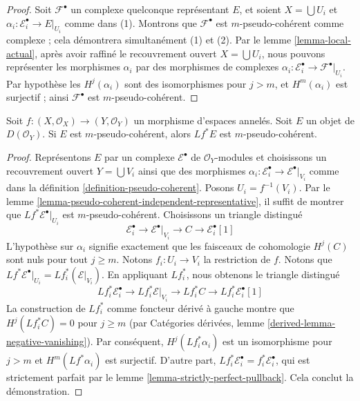 \begin{proof}

Soit $\mathcal{F}^\bullet$ un complexe quelconque représentant $E$,
et soient $X = \bigcup U_i$ et
$\alpha_i : \mathcal{E}_i^\bullet \to E|_{U_i}$ comme dans (1). Montrons que $\mathcal{F}^\bullet$ est $m$-pseudo-cohérent comme complexe ; cela démontrera simultanément (1) et (2). Par le lemme \ref{lemma-local-actual},
après avoir raffiné le recouvrement ouvert $X = \bigcup U_i$, nous pouvons
représenter les morphismes $\alpha_i$ par des morphismes de complexes
$\alpha_i : \mathcal{E}_i^\bullet \to \mathcal{F}^\bullet|_{U_i}$. Par hypothèse
les $H^j(\alpha_i)$ sont des isomorphismes pour $j > m$, et $H^m(\alpha_i)$
est surjectif ; ainsi $\mathcal{F}^\bullet$ est
$m$-pseudo-cohérent.

\end{proof}

\begin{lemma}

\label{lemma-pseudo-coherent-pullback}
Soit $f : (X, \mathcal{O}_X) \to (Y, \mathcal{O}_Y)$ un morphisme d'espaces annelés. Soit $E$ un objet de $D(\mathcal{O}_Y)$. Si $E$ est $m$-pseudo-cohérent, alors $Lf^*E$ est $m$-pseudo-cohérent.
\end{lemma}

\begin{proof}

Représentons $E$ par un complexe $\mathcal{E}^\bullet$ de $\mathcal{O}_Y$-modules et choisissons un recouvrement ouvert $Y = \bigcup V_i$ ainsi que des morphismes
$\alpha_i : \mathcal{E}_i^\bullet \to \mathcal{E}^\bullet|_{V_i}$
comme dans la définition \ref{definition-pseudo-coherent}. Posons $U_i = f^{-1}(V_i)$. Par le lemme \ref{lemma-pseudo-coherent-independent-representative},
il suffit de montrer que $Lf^*\mathcal{E}^\bullet|_{U_i}$ est
$m$-pseudo-cohérent. Choisissons un triangle distingué
$$
\mathcal{E}_i^\bullet \to
\mathcal{E}^\bullet|_{V_i} \to
C \to
\mathcal{E}_i^\bullet[1]
$$
L'hypothèse sur $\alpha_i$ signifie exactement que les faisceaux de cohomologie
$H^j(C)$ sont nuls pour tout $j \geq m$. Notons $f_i : U_i \to V_i$
la restriction de $f$. Notons que $Lf^*\mathcal{E}^\bullet|_{U_i} = 
Lf_i^*(\mathcal{E}|_{V_i})$. En appliquant $Lf_i^*$, nous obtenons le triangle distingué
$$
Lf_i^*\mathcal{E}_i^\bullet \to
Lf_i^*\mathcal{E}|_{V_i} \to
Lf_i^*C \to
Lf_i^*\mathcal{E}_i^\bullet[1]
$$
La construction de $Lf_i^*$ comme foncteur dérivé à gauche montre que
$H^j(Lf_i^*C) = 0$ pour $j \geq m$ (par Catégories dérivées, lemme
\ref{derived-lemma-negative-vanishing}). Par conséquent, $H^j(Lf_i^*\alpha_i)$ est un isomorphisme pour $j > m$ et $H^m(Lf^*\alpha_i)$ est surjectif.
D'autre part, $Lf_i^*\mathcal{E}_i^\bullet = f_i^*\mathcal{E}_i^\bullet$, qui est strictement parfait par le lemme \ref{lemma-strictly-perfect-pullback}. Cela conclut la démonstration.

\end{proof}

